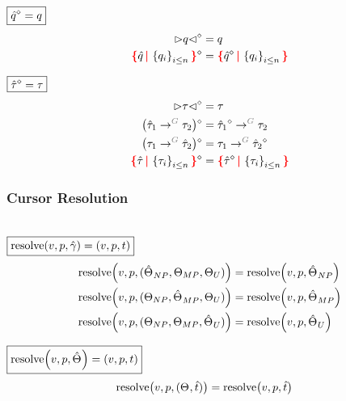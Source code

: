 \noindent $\boxed{\erase{\Z{q}} = q}$
%
\begin{align*}
  \erase{\cursor{q}} &= q \\
  \erase{\conflictHole{\Z{q}, \SetOf{q_i}_{i \leq n}}} &= \conflictHole{\erase{\Z{q}}, \SetOf{q_i}_{i \leq n}}
\end{align*}

\noindent $\boxed{\erase{\Z{\tau}} = \tau}$
%
\begin{align*}
  \erase{\cursor{\tau}} &= \tau \\
  \erase{\left(\tArrow{G}{\Z{\tau}_1}{\tau_2}\right)} &= \tArrow{G}{\erase{\Z{\tau}_1}}{\tau_2} \\
  \erase{\left(\tArrow{G}{\tau_1}{\Z{\tau}_2}\right)} &= \tArrow{G}{\tau_1}{\erase{\Z{\tau}_2}} \\
  \erase{\conflictHole{\Z{\tau}, \SetOf{\tau_i}_{i \leq n}}} &= \conflictHole{\erase{\Z{\tau}}, \SetOf{\tau_i}_{i \leq n}}
\end{align*}


\subsubsection{Cursor Resolution}\hspace*{\fill} \\

\noindent
$\boxed{\resolve{v}{p}{\Z{\Grove}} = (v, p, t)}$
%
\begin{align*}
  \resolve{v}{p}{(\Z{\Set}_{NP}, \Set[MP], \Set[U])} &= \resolve{v}{p}{\Z{\Set}_{NP}} \\
  \resolve{v}{p}{(\Set[NP], \Z{\Set}_{MP}, \Set[U])} &= \resolve{v}{p}{\Z{\Set}_{MP}} \\
  \resolve{v}{p}{(\Set[NP], \Set[MP], \Z{\Set}_{U})} &= \resolve{v}{p}{\Z{\Set}_U}
\end{align*}

\noindent
$\boxed{\resolve{v}{p}{\Z{\Set}} = (v, p, t)}$
%
\begin{align*}
  \resolve{v}{p}{(\Set, \Z{t})} &= \resolve{v}{p}{\Z{t}}
\end{align*}

